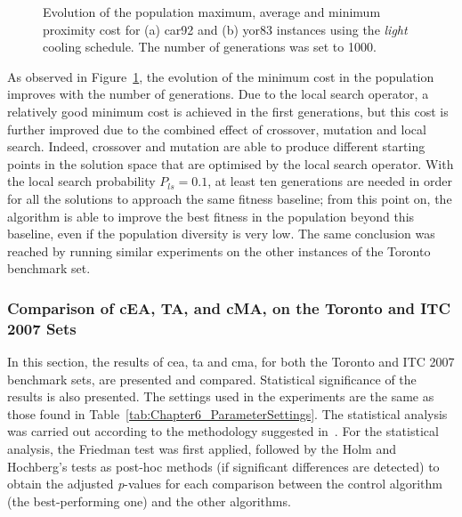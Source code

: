 \begin{figure}[!ht]
	\centering
	  \qquad 
	\caption{Evolution of the population maximum, average and minimum proximity cost for (a) car92 and (b) yor83 instances using the \emph{light} cooling schedule. The number of generations was set to \num{1000}.}
	\label{fig:ProximityCostEvolution} 
\end{figure}


As observed in Figure~\ref{fig:ProximityCostEvolution}, the evolution of the minimum cost in the population improves with the number of generations. Due to the local search operator, a relatively good minimum cost is achieved in the first generations, but this cost is further improved due to the combined effect of crossover, mutation and local search. Indeed, crossover and mutation are able to produce different starting points in the solution space that are optimised by the local search operator. With the local search probability $P_{ls} = 0.1$, at least ten generations are needed in order for all the solutions to approach the same fitness baseline; from this point on, the algorithm is able to improve the best fitness in the population beyond this baseline, even if the population diversity is very low. The same conclusion was reached by running similar experiments on the other instances of the Toronto benchmark set.


%
%
\subsubsection{Comparison of cEA, TA, and cMA, on the Toronto and ITC 2007 Sets}
\label{sec:cEA_TA_cMA_comparison_Toronto_ITC2007}

In this section, the results of \gls{cea}, \gls{ta} and \gls{cma}, for both the Toronto and ITC 2007 benchmark sets, are presented and compared. Statistical significance of the results is also presented. The settings used in the experiments are the same as those found in Table~\ref{tab:Chapter6_ParameterSettings}. The statistical analysis was carried out according to the methodology suggested in~\cite{Garcia2008}. For the statistical analysis, the Friedman test was first applied, followed by the Holm and Hochberg's tests as post-hoc methods (if significant differences are detected) to obtain the adjusted \textit{p}-values for each comparison between the control algorithm (the best-performing one) and the other algorithms.



